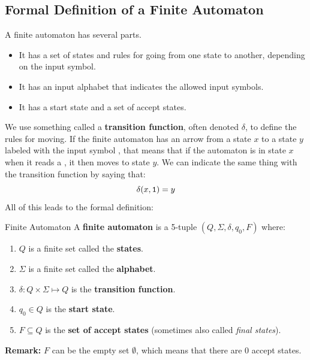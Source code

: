 \documentclass[letterpaper]{article}
\begin{document}
\subsection{Formal Definition of a Finite Automaton}
A finite automaton has several parts.
\begin{itemize}
    \item It has a set of states and rules for going from one state to another, depending on the input symbol.
    \item It has an input alphabet that indicates the allowed input symbols. 
    \item It has a start state and a set of accept states. 
\end{itemize}
We use something called a \textbf{transition function}, often denoted $\delta$, to define the rules for moving. If the finite automaton has an arrow from a state $x$ to a state $y$ labeled with the input symbol , that means that if the automaton is in state $x$ when it reads a , it then moves to state $y$. We can indicate the same thing with the transition function by saying that: 
\[\delta(x, \texttt{1}) = y\]
All of this leads to the formal definition:
\begin{definition}{Finite Automaton}{}
    A \textbf{finite automaton} is a 5-tuple $(Q, \Sigma, \delta, q_0, F)$ where: 
    \begin{enumerate}
        \item $Q$ is a finite set called the \textbf{states}.
        \item $\Sigma$ is a finite set called the \textbf{alphabet}.
        \item $\delta: Q \times \Sigma \mapsto Q$ is the \textbf{transition function}.
        \item $q_0 \in Q$ is the \textbf{start state}.
        \item $F \subseteq Q$ is the \textbf{set of accept states} (sometimes also called \emph{final states}).
    \end{enumerate}
\end{definition}
\textbf{Remark:} $F$ can be the empty set $\emptyset$, which means that there are 0 accept states.
\end{document}
